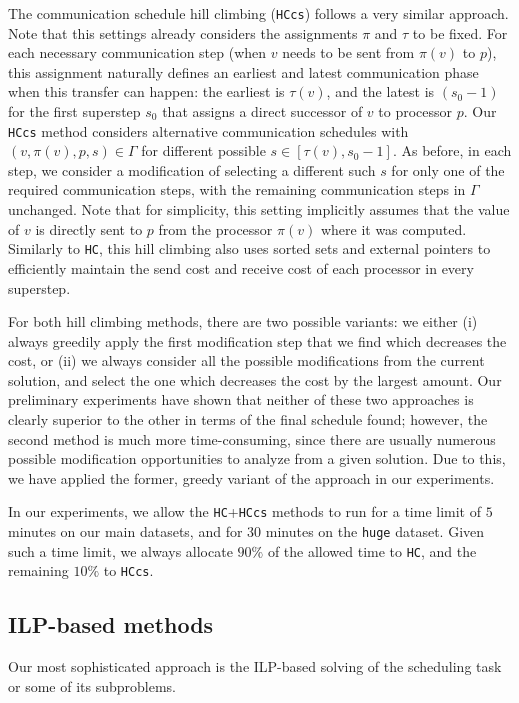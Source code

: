 \documentclass[sigconf,nonacm]{acmart}
\begin{document}
The communication schedule hill climbing (\texttt{HCcs}) follows a very similar approach. Note that this settings already considers the assignments $\pi$ and $\tau$ to be fixed. For each necessary communication step (when $v$ needs to be sent from $\pi(v)$ to $p$), this assignment naturally defines an earliest and latest communication phase when this transfer can happen: the earliest is $\tau(v)$, and the latest is $(s_0-1)$ for the first superstep $s_0$ that assigns a direct successor of $v$ to processor $p$. Our \texttt{HCcs} method considers alternative communication schedules with $(v, \pi(v), p, s) \in \Gamma$ for different possible $s \in [\tau(v), s_0-1]$. As before, in each step, we consider a modification of selecting a different such $s$ for only one of the required communication steps, with the remaining communication steps in $\Gamma$ unchanged. Note that for simplicity, this setting implicitly assumes that the value of $v$ is directly sent to $p$ from the processor $\pi(v)$ where it was computed. Similarly to \texttt{HC}, this hill climbing also uses sorted sets and external pointers to efficiently maintain the send cost and receive cost of each processor in every superstep.

For both hill climbing methods, there are two possible variants: we either (i) always greedily apply the first modification step that we find which decreases the cost, or (ii) we always consider all the possible modifications from the current solution, and select the one which decreases the cost by the largest amount. Our preliminary experiments have shown that neither of these two approaches is clearly superior to the other in terms of the final schedule found; however, the second method is much more time-consuming, since there are usually numerous possible modification opportunities to analyze from a given solution. Due to this, we have applied the former, greedy variant of the approach in our experiments.

In our experiments, we allow the \texttt{HC}+\texttt{HCcs} methods to run for a time limit of $5$ minutes on our main datasets, and for $30$ minutes on the \texttt{huge} dataset. Given such a time limit, we always allocate $90\%$ of the allowed time to \texttt{HC}, and the remaining $10\%$ to \texttt{HCcs}.

\subsection{ILP-based methods}

Our most sophisticated approach is the ILP-based solving of the scheduling task or some of its subproblems.
\end{document}
